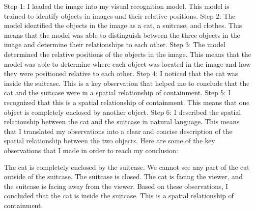 \begin{enumerate}
\begin{enumerate}
        Step 1: I loaded the image into my visual recognition model. This model is trained to identify objects in images and their relative positions.
        Step 2: The model identified the objects in the image as a cat, a suitcase, and clothes. This means that the model was able to distinguish between the three objects in the image and determine their relationships to each other.
        Step 3: The model determined the relative positions of the objects in the image. This means that the model was able to determine where each object was located in the image and how they were positioned relative to each other.
        Step 4: I noticed that the cat was inside the suitcase. This is a key observation that helped me to conclude that the cat and the suitcase were in a spatial relationship of containment.
        Step 5: I recognized that this is a spatial relationship of containment. This means that one object is completely enclosed by another object.
        Step 6: I described the spatial relationship between the cat and the suitcase in natural language. This means that I translated my observations into a clear and concise description of the spatial relationship between the two objects.
        Here are some of the key observations that I made in order to reach my conclusion:
        
        The cat is completely enclosed by the suitcase.
        We cannot see any part of the cat outside of the suitcase.
        The suitcase is closed.
        The cat is facing the viewer, and the suitcase is facing away from the viewer.
        Based on these observations, I concluded that the cat is inside the suitcase. This is a spatial relationship of containment.
        

\end{enumerate}
\end{enumerate}
